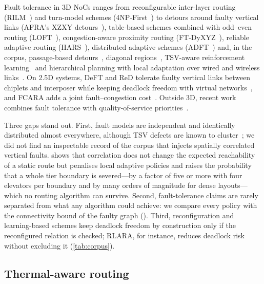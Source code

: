 Fault tolerance in 3D NoCs ranges from reconfigurable inter-layer routing (RILM~\cite{rusu2010rilm}) and turn-model schemes (4NP-First~\cite{pasricha2011lowoverhead}) to detours around faulty vertical links (AFRA's XZXY detours~\cite{akbari2012afra}), table-based schemes combined with odd--even routing (LOFT~\cite{zhou2016loft}), congestion-aware proximity routing (FT-DyXYZ~\cite{jouybari2014dyxyz}), reliable adaptive routing (HARS~\cite{zhou2014hars}), distributed adaptive schemes (ADFT~\cite{mogharrabi2020adft}) and, in the corpus, passage-based detours~\cite{kurokawa2025passage}, diagonal regions~\cite{jiao2023aftc}, TSV-aware reinforcement learning~\cite{jiao2023rlara} and hierarchical planning with local adaptation over wired and wireless links~\cite{singh2026atlas}. On 2.5D systems, DeFT and ReD tolerate faulty vertical links between chiplets and interposer while keeping deadlock freedom with virtual networks~\cite{taheri2022deft,taheri2024red}, and FCARA adds a joint fault--congestion cost~\cite{zhou2025fcara}. Outside 3D, recent work combines fault tolerance with quality-of-service priorities~\cite{yu2025topsis}.

Three gaps stand out. First, fault models are independent and identically distributed almost everywhere, although TSV defects are known to cluster~\cite{dang2021hotcluster,wang2015clustering}; we did not find an inspectable record of the corpus that injects spatially correlated vertical faults.  shows that correlation does not change the expected reachability of a static route but penalises local adaptive policies and raises the probability that a whole tier boundary is severed---by a factor of five or more with four elevators per boundary and by many orders of magnitude for dense layouts---which no routing algorithm can survive. Second, fault-tolerance claims are rarely separated from what any algorithm could achieve: we compare every policy with the connectivity bound of the faulty graph (). Third, reconfiguration and learning-based schemes keep deadlock freedom by construction only if the reconfigured relation is checked; RLARA, for instance, reduces deadlock risk without excluding it (\cref{tab:corpus}).

\subsection{Thermal-aware routing}
\label{sec:rev-thermal}

